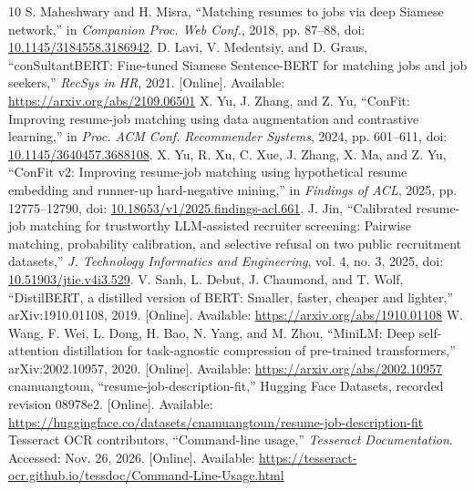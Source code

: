 \documentclass[conference,a4paper]{IEEEtran}
\begin{document}
\begin{thebibliography}{10}
 S. Maheshwary and H. Misra, ``Matching resumes to jobs via deep Siamese network,'' in \emph{Companion Proc. Web Conf.}, 2018, pp. 87--88, doi: \href{https://doi.org/10.1145/3184558.3186942}{10.1145/3184558.3186942}.
 D. Lavi, V. Medentsiy, and D. Graus, ``conSultantBERT: Fine-tuned Siamese Sentence-BERT for matching jobs and job seekers,'' \emph{RecSys in HR}, 2021. [Online]. Available: \url{https://arxiv.org/abs/2109.06501}
 X. Yu, J. Zhang, and Z. Yu, ``ConFit: Improving resume-job matching using data augmentation and contrastive learning,'' in \emph{Proc. ACM Conf. Recommender Systems}, 2024, pp. 601--611, doi: \href{https://doi.org/10.1145/3640457.3688108}{10.1145/3640457.3688108}.
 X. Yu, R. Xu, C. Xue, J. Zhang, X. Ma, and Z. Yu, ``ConFit v2: Improving resume-job matching using hypothetical resume embedding and runner-up hard-negative mining,'' in \emph{Findings of ACL}, 2025, pp. 12775--12790, doi: \href{https://doi.org/10.18653/v1/2025.findings-acl.661}{10.18653/v1/2025.findings-acl.661}.
 J. Jin, ``Calibrated resume-job matching for trustworthy LLM-assisted recruiter screening: Pairwise matching, probability calibration, and selective refusal on two public recruitment datasets,'' \emph{J. Technology Informatics and Engineering}, vol. 4, no. 3, 2025, doi: \href{https://doi.org/10.51903/jtie.v4i3.529}{10.51903/jtie.v4i3.529}.
 V. Sanh, L. Debut, J. Chaumond, and T. Wolf, ``DistilBERT, a distilled version of BERT: Smaller, faster, cheaper and lighter,'' arXiv:1910.01108, 2019. [Online]. Available: \url{https://arxiv.org/abs/1910.01108}
 W. Wang, F. Wei, L. Dong, H. Bao, N. Yang, and M. Zhou, ``MiniLM: Deep self-attention distillation for task-agnostic compression of pre-trained transformers,'' arXiv:2002.10957, 2020. [Online]. Available: \url{https://arxiv.org/abs/2002.10957}
 cnamuangtoun, ``resume-job-description-fit,'' Hugging Face Datasets, recorded revision 08978e2. [Online]. Available: \url{https://huggingface.co/datasets/cnamuangtoun/resume-job-description-fit}
 Tesseract OCR contributors, ``Command-line usage,'' \emph{Tesseract Documentation}. Accessed: Nov. 26, 2026. [Online]. Available: \url{https://tesseract-ocr.github.io/tessdoc/Command-Line-Usage.html}
\end{thebibliography}
\end{document}
